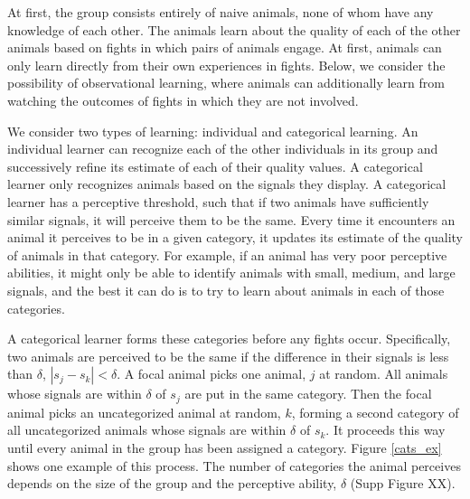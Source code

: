 At first, the group consists entirely of naive animals, none of whom have any knowledge of each other. The animals learn about the quality of each of the other animals based on fights in which pairs of animals engage. At first, animals can only learn directly from their own experiences in fights. Below, we consider the possibility of observational learning, where animals can additionally learn from watching the outcomes of fights in which they are not involved.  

We consider two types of learning: individual and categorical learning. An individual learner can recognize each of the other individuals in its group and successively refine its estimate of each of their quality values. A categorical learner only recognizes animals based on the signals they display. A categorical learner has a perceptive threshold, such that if two animals have sufficiently similar signals, it will perceive them to be the same. Every time it encounters an animal it perceives to be in a given category, it updates its estimate of the quality of animals in that category. For example, if an animal has very poor perceptive abilities, it might only be able to identify animals with small, medium, and large signals, and the best it can do is to try to learn about animals in each of those categories. 

A categorical learner forms these categories before any fights occur. Specifically, two animals are perceived to be the same if the difference in their signals is less than $\delta$, $|s_j-s_k|<\delta$. A focal animal picks one animal, $j$ at random. All animals whose signals are within $\delta$ of $s_j$ are put in the same category. Then the focal animal picks an uncategorized animal at random, $k$, forming a second category of all uncategorized animals whose signals are within $\delta$ of $s_k$. It proceeds this way until every animal in the group has been assigned a category.  Figure \ref{cats_ex} shows one example of this process. The number of categories the animal perceives depends on the size of the group and the perceptive ability, $\delta$ (Supp Figure XX).


